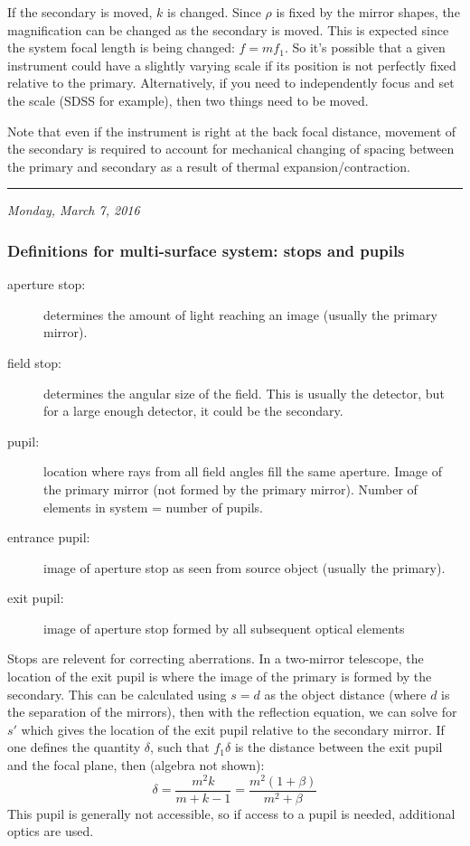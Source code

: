 \documentclass[12pt]{article}
\newcommand{\mydate}[1]{
    \begin{flushright}
        \rule{\textwidth}{0.4pt} %
        \small\hfill\textit{#1}
    \end{flushright}}
\begin{document}
If the secondary is moved, $k$ is changed. Since $\rho$ is fixed by the mirror
shapes, the magnification can be changed as the secondary is moved. This is
expected since the system focal length is being changed: $f = mf_{1}$. So it's
possible that a given instrument could have a slightly varying scale if its
position is not perfectly fixed relative to the primary. Alternatively, if you
need to independently focus and set the scale (SDSS for example), then two
things need to be moved.

Note that even if the instrument is right at the back focal distance, movement
of the secondary is required to account for mechanical changing of spacing
between the primary and secondary as a result of thermal expansion/contraction.

\mydate{Monday, March 7, 2016}
\subsubsection{Definitions for multi-surface system: stops and pupils}
\begin{description}
    \item [aperture stop:] determines the amount of light reaching an
        image (usually the primary mirror).
    \item [field stop:] determines the angular size of the field. This
        is usually the detector, but for a large enough detector, it
        could be the secondary.
    \item [pupil:] location where rays from all field angles fill the
        same aperture. Image of the primary mirror (not formed by
        the primary mirror). Number of elements in system = number
        of pupils.
    \item [entrance pupil:] image of aperture stop as seen from source
        object (usually the primary).
    \item [exit pupil:] image of aperture stop formed by all subsequent
        optical elements
\end{description}
Stops are relevent for correcting aberrations.
In a two-mirror telescope, the location of the exit pupil is where the
image of the primary is formed by the secondary. This can be calculated
using $s=d$ as the object distance (where $d$ is the separation of the
mirrors), then with the reflection equation, we can solve for $s'$
which gives the location of the exit pupil relative to the secondary
mirror. If one defines the quantity $\delta$, such that $f_{1}\delta$
is the distance between the exit pupil and the focal plane,
then (algebra not shown):
\[
    \delta = \frac{m^{2}k}{m+k-1} = \frac{m^{2}(1+\beta)}{m^{2}+\beta}
    \]
This pupil is generally not accessible, so if access to a pupil is
needed, additional optics are used.
\end{document}
